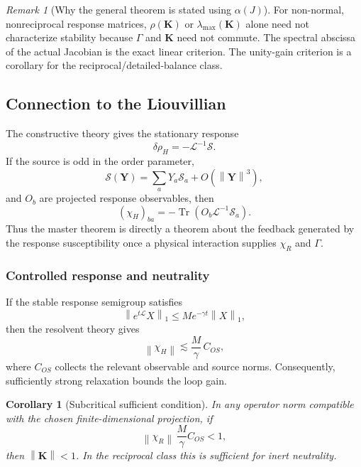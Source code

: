 \documentclass[11pt]{article}
\newtheorem{corollary}[theorem]{Corollary}
\theoremstyle{definition}
\theoremstyle{remark}
\newtheorem{remark}[theorem]{Remark}
\newcommand{\norm}[1]{\left\lVert #1\right\rVert}
\newcommand{\Tr}{\operatorname{Tr}}
\newcommand{\Y}{\mathbf{Y}}
\newcommand{\K}{\mathbf{K}}
\newcommand{\Gm}{\Gamma}
\newcommand{\chiR}{\chi_{R}}
\newcommand{\chiH}{\chi_{H}}
\begin{document}
\begin{remark}[Why the general theorem is stated using $\alpha(J)$]
For non-normal, nonreciprocal response matrices, $\rho(\K)$ or $\lambda_{\max}(\K)$ alone need not characterize stability because $\Gm$ and $\K$ need not commute.  The spectral abscissa of the actual Jacobian is the exact linear criterion.  The unity-gain criterion is a corollary for the reciprocal/detailed-balance class.
\end{remark}

\subsection{Connection to the Liouvillian}
The constructive theory gives the stationary response
\begin{equation}
 \delta\rho_H=-\mathcal L^{-1}\mathcal S.
\end{equation}
If the source is odd in the order parameter,
\begin{equation}
 \mathcal S(\Y)=\sum_a Y_a\mathcal S_a+O(\norm{\Y}^3),
\end{equation}
and $O_b$ are projected response observables, then
\begin{equation}
 (\chiH)_{ba}=-\Tr\!\left(O_b\mathcal L^{-1}\mathcal S_a\right).
 \label{eq:paper1chi}
\end{equation}
Thus the master theorem is directly a theorem about the feedback generated by the response susceptibility once a physical interaction supplies $\chiR$ and $\Gm$.

\subsubsection{Controlled response and neutrality}
If the stable response semigroup satisfies
\begin{equation}
 \norm{e^{t\mathcal L}X}_1\le M e^{-\gamma t}\norm{X}_1,
\end{equation}
then the resolvent theory gives
\begin{equation}
 \norm{\chiH}\lesssim \frac{M}{\gamma}\,C_{OS},
 \label{eq:boundchi}
\end{equation}
where $C_{OS}$ collects the relevant observable and source norms.  Consequently, sufficiently strong relaxation bounds the loop gain.

\begin{corollary}[Subcritical sufficient condition]\label{cor:subcrit}
In any operator norm compatible with the chosen finite-dimensional projection, if
\begin{equation}
 \norm{\chiR}\,\frac{M}{\gamma}C_{OS}<1,
 \label{eq:subcrit}
\end{equation}
then $\norm{\K}<1$.  In the reciprocal class this is sufficient for inert neutrality.
\end{corollary}
\end{document}
